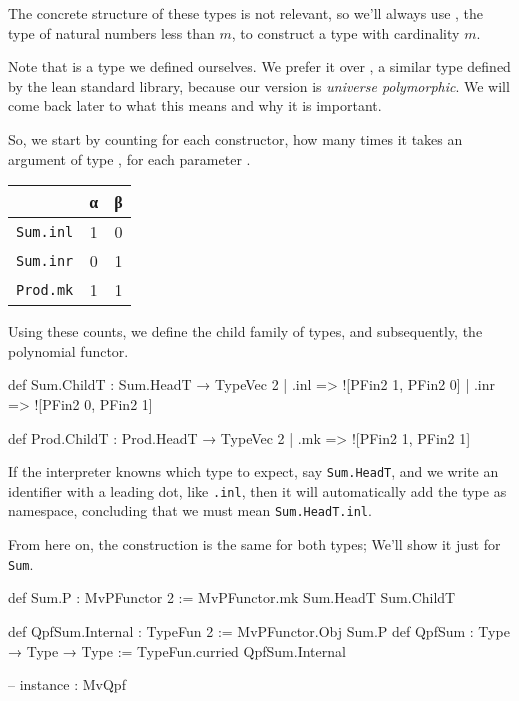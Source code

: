 \documentclass[titlepage]{report}
\newenvironment{remark}{%
\begin{framed}
\begin{trivlist}
    \item[\hskip \labelsep {\bfseries Remark:}]}%
{%
\end{trivlist}%
\end{framed}
}
\begin{document}
The concrete structure of these types is not relevant, so we'll always use , the type
of natural numbers less than $m$, to construct a type with cardinality $m$.

\begin{remark}
    Note that  is a type we defined ourselves. We prefer it over , a similar
    type defined by the lean standard library, because our version is \emph{universe polymorphic}.
    We will come back later to what this means and why it is important.
\end{remark}

So, we start by counting for each constructor, how many times it takes an argument of type ,
for each parameter .
\begin{center}
\begin{tabular}{l|c|c}
    & α & β \\ \hline
    \texttt{Sum.inl}  & 1 & 0 \\
    \texttt{Sum.inr}  & 0 & 1 \\
    \texttt{Prod.mk}  & 1 & 1 \\    
\end{tabular}    
\end{center}

Using these counts, we define the child family of types, and subsequently, the polynomial functor.

\begin{center}
  \begin{leancode}
    def Sum.ChildT : Sum.HeadT → TypeVec 2
      | .inl => ![PFin2 1, PFin2 0]
      | .inr => ![PFin2 0, PFin2 1]

    def Prod.ChildT : Prod.HeadT → TypeVec 2
      | .mk  => ![PFin2 1, PFin2 1]
  \end{leancode}
\end{center}

\begin{remark}
    If the interpreter knowns which type to expect, say \texttt{Sum.HeadT}, and we write an identifier with a leading
    dot, like \texttt{.inl}, then it will automatically add the type as namespace, concluding that
    we must mean \texttt{Sum.HeadT.inl}.
\end{remark}
From here on, the construction is the same for both types;
We'll show it just for \texttt{Sum}.
\begin{center}
    \begin{leancode}
    def Sum.P  : MvPFunctor 2 := MvPFunctor.mk Sum.HeadT  Sum.ChildT

    
    def QpfSum.Internal : TypeFun 2  := MvPFunctor.Obj Sum.P
    def QpfSum : Type → Type → Type := TypeFun.curried QpfSum.Internal

    -- instance : MvQpf 
  \end{leancode}
\end{center}
\end{document}
